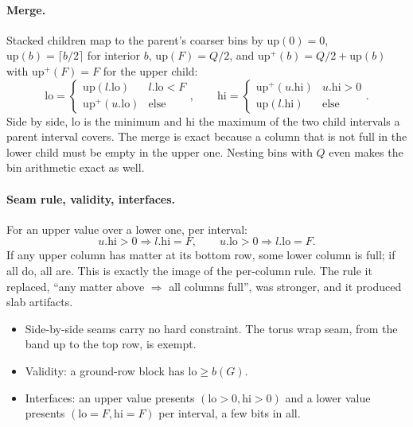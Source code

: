 \documentclass[11pt]{article}
\newcommand{\1}{\mathds{1}}
\begin{document}
\paragraph{Merge.} Stacked children map to the parent's coarser bins by
$\mathrm{up}(0) = 0$, $\mathrm{up}(b) = \lceil b/2 \rceil$ for interior $b$,
$\mathrm{up}(F) = Q/2$, and $\mathrm{up}^+(b) = Q/2 + \mathrm{up}(b)$ with $\mathrm{up}^+(F) = F$
for the upper child:
\[
  \mathrm{lo} = \begin{cases} \mathrm{up}(l.\mathrm{lo}) & l.\mathrm{lo} < F \\
                              \mathrm{up}^+(u.\mathrm{lo}) & \text{else} \end{cases},
  \qquad
  \mathrm{hi} = \begin{cases} \mathrm{up}^+(u.\mathrm{hi}) & u.\mathrm{hi} > 0 \\
                              \mathrm{up}(l.\mathrm{hi}) & \text{else} \end{cases}.
\]
Side by side, lo is the minimum and hi the maximum of the two child intervals a parent interval
covers. The merge is exact because a column that is not full in the lower child must be empty
in the upper one. Nesting bins with $Q$ even makes the bin arithmetic exact as well.

\paragraph{Seam rule, validity, interfaces.} For an upper value over a lower one, per interval:
\[
  u.\mathrm{hi} > 0 \Rightarrow l.\mathrm{hi} = F, \qquad
  u.\mathrm{lo} > 0 \Rightarrow l.\mathrm{lo} = F.
\]
If any upper column has matter at its bottom row, some lower column is full; if all do, all
are. This is exactly the image of the per-column rule. The rule it replaced, ``any matter above
$\Rightarrow$ all columns full'', was stronger, and it produced slab artifacts.
\begin{itemize}
  \item Side-by-side seams carry no hard constraint. The torus wrap seam, from the band up to
        the top row, is exempt.
  \item Validity: a ground-row block has $\mathrm{lo} \ge b(G)$.
  \item Interfaces: an upper value presents $(\mathrm{lo}>0, \mathrm{hi}>0)$ and a lower value
        presents $(\mathrm{lo}=F, \mathrm{hi}=F)$ per interval, a few bits in all.
\end{itemize}
\end{document}
